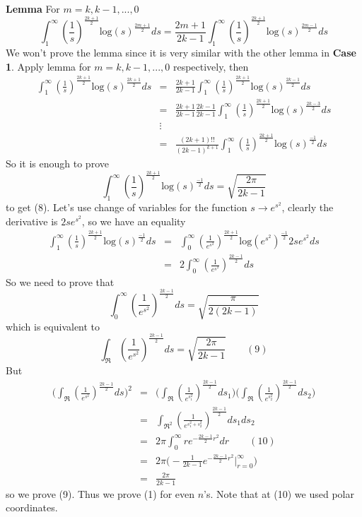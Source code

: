 \documentclass[a4paper,10pt]{article}
\begin{document}
\textbf{Lemma} For $m=k,k-1,...,0$ 
$$\int_{1}^{\infty}(\frac{1}{s})^{\frac{2k+1}{2}}\text{log}(s)^{\frac{2m+1}{2}}ds=\frac{2m+1}{2k-1}\int_{1}^{\infty}(\frac{1}{s})^{\frac{2k+1}{2}}\text{log}(s)^{\frac{2m-1}{2}}ds$$ We won't prove the lemma since it is very similar with the other lemma in \textbf{Case 1}. Apply lemma for $m=k,k-1,...,0$ respectively, then \begin{eqnarray*}
\int_{1}^{\infty}(\frac{1}{s})^{\frac{2k+1}{2}}\text{log}(s)^{\frac{2k+1}{2}}ds&=&\frac{2k+1}{2k-1}\int_{1}^{\infty}(\frac{1}{s})^{\frac{2k+1}{2}}\text{log}(s)^{\frac{2k-1}{2}}ds\\
&=&\frac{2k+1}{2k-1}\frac{2k-1}{2k-1}\int_{1}^{\infty}(\frac{1}{s})^{\frac{2k+1}{2}}\text{log}(s)^{\frac{2k-3}{2}}ds\\
&\vdots&\\
&=&\frac{(2k+1)!!}{(2k-1)^{k+1}}\int_{1}^{\infty}(\frac{1}{s})^{\frac{2k+1}{2}}\text{log}(s)^{\frac{-1}{2}}ds
\end{eqnarray*} So it is enough to prove $$\int_{1}^{\infty}(\frac{1}{s})^{\frac{2k+1}{2}}\text{log}(s)^{\frac{-1}{2}}ds=\sqrt{\frac{2\pi}{2k-1}}$$ to get (8). Let's use change of variables for the function $s\rightarrow e^{s^2}$, clearly the derivative is $2se^{s^2}$, so we have an equality 
\begin{eqnarray*}
\int_{1}^{\infty}(\frac{1}{s})^{\frac{2k+1}{2}}\text{log}(s)^{\frac{-1}{2}}ds&=&\int_{0}^{\infty}(\frac{1}{e^{s^2}})^{\frac{2k+1}{2}}\text{log}(e^{s^2})^{\frac{-1}{2}}2se^{s^2}ds\\
&=& 2\int_{0}^{\infty}(\frac{1}{e^{s^2}})^{\frac{2k-1}{2}}ds
\end{eqnarray*} So we need to prove that $$\int_{0}^{\infty}(\frac{1}{e^{s^2}})^{\frac{2k-1}{2}}ds=\sqrt{\frac{\pi}{2(2k-1)}}$$ which is equivalent to $$\int_{\Re}(\frac{1}{e^{s^2}})^{\frac{2k-1}{2}}ds=\sqrt{\frac{2\pi}{2k-1}}\qquad(9)$$ But \begin{eqnarray*}
\bigg(\int_{\Re}(\frac{1}{e^{s^2}})^{\frac{2k-1}{2}}ds\bigg)^2&=&\bigg(\int_{\Re}(\frac{1}{e^{s_1^2}})^{\frac{2k-1}{2}}ds_1\bigg)\bigg(\int_{\Re}(\frac{1}{e^{s_2^2}})^{\frac{2k-1}{2}}ds_2\bigg)\\
&=&\int_{\Re^2}(\frac{1}{e^{s_1^2+s_2^2}})^{\frac{2k-1}{2}}ds_1ds_2 \\
&=&2\pi\int_{0}^{\infty}re^{-\frac{2k-1}{2}r^2}dr\qquad(10)\\
&=&2\pi\bigg(-\frac{1}{2k-1}e^{-\frac{2k-1}{2}r^2}\bigg|^\infty_{r=0}\bigg)\\
&=&\frac{2\pi}{2k-1}
\end{eqnarray*} so we prove (9). Thus we prove (1) for even $n$'s. Note that at (10) we used polar coordinates. \\
\end{document}
